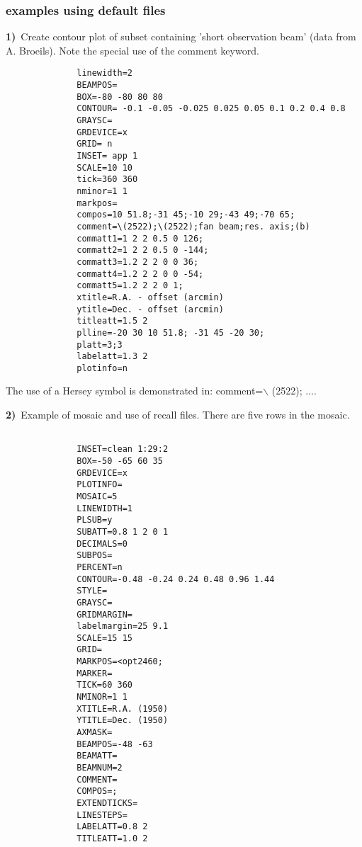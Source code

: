 \subsubsection*{examples using default files}





             {\bf 1)}\ Create contour plot of subset containing
                'short observation beam' (data from A. Broeils).
                Note the special use of the comment keyword.

\begin{verbatim}
              linewidth=2
              BEAMPOS=
              BOX=-80 -80 80 80
              CONTOUR= -0.1 -0.05 -0.025 0.025 0.05 0.1 0.2 0.4 0.8
              GRAYSC=
              GRDEVICE=x
              GRID= n
              INSET= app 1
              SCALE=10 10
              tick=360 360
              nminor=1 1
              markpos=
              compos=10 51.8;-31 45;-10 29;-43 49;-70 65;
              comment=\(2522);\(2522);fan beam;res. axis;(b)
              commatt1=1 2 2 0.5 0 126;
              commatt2=1 2 2 0.5 0 -144;
              commatt3=1.2 2 2 0 0 36;
              commatt4=1.2 2 2 0 0 -54;
              commatt5=1.2 2 2 0 1;
              xtitle=R.A. - offset (arcmin)
              ytitle=Dec. - offset (arcmin)
              titleatt=1.5 2
              plline=-20 30 10 51.8; -31 45 -20 30;
              platt=3;3
              labelatt=1.3 2
              plotinfo=n

\end{verbatim}
              
              The use of a Hersey symbol is demonstrated in:
              comment=$\backslash$ (2522); ....\newline
              \bigskip



              {\bf 2)}\ Example of mosaic and use of recall files. There are 
                 five rows in the mosaic.

\begin{verbatim}
              
              INSET=clean 1:29:2
              BOX=-50 -65 60 35
              GRDEVICE=x
              PLOTINFO=
              MOSAIC=5
              LINEWIDTH=1
              PLSUB=y
              SUBATT=0.8 1 2 0 1
              DECIMALS=0
              SUBPOS=
              PERCENT=n
              CONTOUR=-0.48 -0.24 0.24 0.48 0.96 1.44
              STYLE=
              GRAYSC=
              GRIDMARGIN=
              labelmargin=25 9.1              
              SCALE=15 15
              GRID=
              MARKPOS=<opt2460;
              MARKER=
              TICK=60 360
              NMINOR=1 1
              XTITLE=R.A. (1950)
              YTITLE=Dec. (1950)
              AXMASK=
              BEAMPOS=-48 -63
              BEAMATT=
              BEAMNUM=2
              COMMENT=
              COMPOS=;
              EXTENDTICKS=
              LINESTEPS=
              LABELATT=0.8 2
              TITLEATT=1.0 2

\end{verbatim}
              

